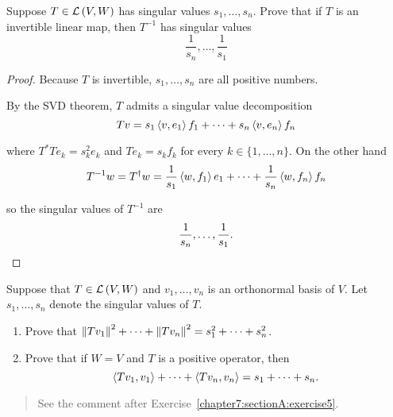 \begin{exercise}
    Suppose $T\in\mathcal{L}\left({V, W}\right)$ has singular values $s_{1}, \ldots, s_{n}$. Prove that if $T$ is an invertible linear map, then $T^{-1}$ has singular values
    \[
        \frac{1}{s_{n}}, \ldots, \frac{1}{s_{1}}
    \]
\end{exercise}

\begin{proof}
    Because $T$ is invertible, $s_{1}, \ldots, s_{n}$ are all positive numbers.

    By the SVD theorem, $T$ admits a singular value decomposition
    \[
        Tv = s_{1}\left\langle{v, e_{1}}\right\rangle f_{1} + \cdots + s_{n}\left\langle{v, e_{n}}\right\rangle f_{n}
    \]

    where $T^{*}Te_{k} = s_{k}^{2}e_{k}$ and $Te_{k} = s_{k}f_{k}$ for every $k\in\{1,\ldots,n\}$. On the other hand
    \[
        T^{-1}w = T^{\dagger}w = \frac{1}{s_{1}}\left\langle{w,f_{1}}\right\rangle e_{1} + \cdots + \frac{1}{s_{n}}\left\langle{w,f_{n}}\right\rangle f_{n}
    \]

    so the singular values of $T^{-1}$ are
    \[
        \frac{1}{s_{n}}, \ldots, \frac{1}{s_{1}}.\qedhere
    \]
\end{proof}
\newpage

\begin{exercise}\label{chapter7:sectionE:exercise11}
    Suppose that $T\in\mathcal{L}\left({V, W}\right)$ and $v_{1}, \ldots, v_{n}$ is an orthonormal basis of $V$. Let $s_{1}, \ldots, s_{n}$ denote the singular values of $T$.
    \begin{enumerate}[label={(\alph*)}]
        \item Prove that $\left\Vert{Tv_{1}}\right\Vert^{2} + \cdots + \left\Vert{Tv_{n}}\right\Vert^{2} = s_{1}^{2} + \cdots + s_{n}^{2}$.
        \item Prove that if $W = V$ and $T$ is a positive operator, then
              \[
                  \left\langle{Tv_{1}, v_{1}}\right\rangle + \cdots + \left\langle{Tv_{n}, v_{n}}\right\rangle = s_{1} + \cdots + s_{n}.
              \]
    \end{enumerate}
\end{exercise}

\begin{quote}
    See the comment after Exercise~\ref{chapter7:sectionA:exercise5}.
\end{quote}

